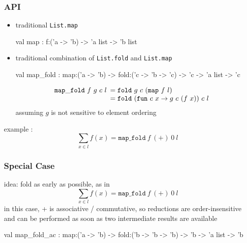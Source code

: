 \documentclass{beamer}
\let\emph\alert
\begin{document}
\begin{frame}\frametitle{API}
  \begin{itemize}
  \item traditional \texttt{List.map}
\begin{ocaml}
 val map : 
  f:('a -> 'b) -> 'a list -> 'b list
\end{ocaml}

    \bigskip
  \item traditional combination of \texttt{List.fold} and \texttt{List.map}
  
\begin{ocaml}
 val map_fold :
  map:('a -> 'b) -> fold:('c -> 'b -> 'c) -> 
  'c -> 'a list -> 'c
\end{ocaml}
    \begin{displaymath}
      \mathtt{map\_fold}~f~g~c~l
      \begin{array}[t]{l}
        = \mathtt{fold}~g~c~(\mathtt{map}~f~l) \\
        = \mathtt{fold}~(\mathtt{fun}~c~x\rightarrow g~c~(f~x))~c~l\\
      \end{array}
    \end{displaymath}
    assuming $g$ is not sensitive to element ordering
  \end{itemize}

  example :
  \begin{displaymath}
    \sum_{x\in l}f(x) = \mathtt{map\_fold}~f~(+)~0~l
  \end{displaymath}
\end{frame}

\begin{frame}\frametitle{Special Case}
  \emph{idea}: fold as early as possible, as in
  \begin{displaymath}
    \sum_{x\in l}f(x) = \mathtt{map\_fold}~f~(+)~0~l
  \end{displaymath}
  in this case, + is \emph{associative / commutative}, so reductions are
  order-insensitive and can be performed as soon as two intermediate
  results are available


  \begin{ocaml}
val map_fold_ac :
  map:('a -> 'b) -> fold:('b -> 'b -> 'b) -> 
  'b -> 'a list -> 'b
  \end{ocaml}
\end{frame}
\end{document}
